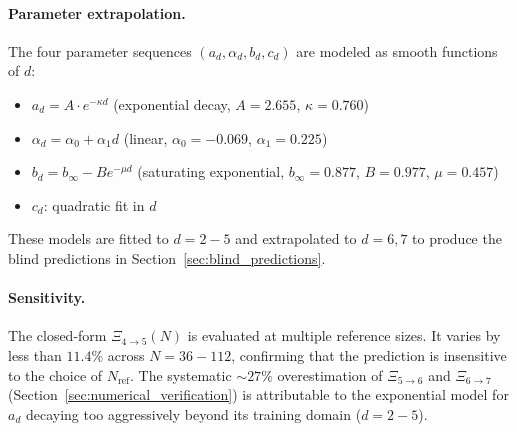 \documentclass[12pt,a4paper]{article}
\begin{document}
\paragraph{Parameter extrapolation.}
The four parameter sequences $(a_d, \alpha_d, b_d, c_d)$ are modeled as smooth functions of $d$:
\begin{itemize}
  \item $a_d = A \cdot e^{-\kappa d}$ (exponential decay, $A = 2.655$, $\kappa = 0.760$)
  \item $\alpha_d = \alpha_0 + \alpha_1 d$ (linear, $\alpha_0 = -0.069$, $\alpha_1 = 0.225$)
  \item $b_d = b_\infty - B e^{-\mu d}$ (saturating exponential, $b_\infty = 0.877$, $B = 0.977$, $\mu = 0.457$)
  \item $c_d$: quadratic fit in $d$
\end{itemize}
These models are fitted to $d = 2{-}5$ and extrapolated to $d = 6, 7$ to produce the blind
predictions in Section~\ref{sec:blind_predictions}.

\paragraph{Sensitivity.}
The closed-form $\Xi_{4 \to 5}(N)$ is evaluated at multiple reference sizes.
It varies by less than $11.4\%$ across $N = 36{-}112$, confirming that the prediction is
insensitive to the choice of $N_\text{ref}$.
The systematic $\sim 27\%$ overestimation of $\Xi_{5 \to 6}$ and $\Xi_{6 \to 7}$
(Section~\ref{sec:numerical_verification}) is attributable to the exponential model for $a_d$
decaying too aggressively beyond its training domain ($d = 2{-}5$).
\end{document}
